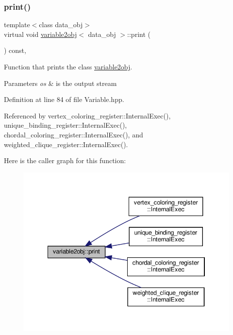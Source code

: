 \mbox{\label{structvariable2obj_a3de17dd615a1c64089337a0461ff0075}} 
\subsubsection{\texorpdfstring{print()}{print()}}
{\footnotesize\ttfamily template$<$class data\+\_\+obj$>$ \\
virtual void \hyperlink{structvariable2obj}{variable2obj}$<$ data\+\_\+obj $>$\+::print (\begin{DoxyParamCaption}{ }\end{DoxyParamCaption}) const\hspace{0.3cm}{\ttfamily [inline]}, {\ttfamily [virtual]}}



Function that prints the class \hyperlink{structvariable2obj}{variable2obj}. 


\begin{DoxyParams}{Parameters}
{\em os} & is the output stream \\
\hline
\end{DoxyParams}


Definition at line 84 of file Variable.\+hpp.



Referenced by vertex\+\_\+coloring\+\_\+register\+::\+Internal\+Exec(), unique\+\_\+binding\+\_\+register\+::\+Internal\+Exec(), chordal\+\_\+coloring\+\_\+register\+::\+Internal\+Exec(), and weighted\+\_\+clique\+\_\+register\+::\+Internal\+Exec().

Here is the caller graph for this function\+:
\nopagebreak
\begin{figure}[H]
\begin{center}
\leavevmode
\includegraphics[width=334pt]{d9/d92/structvariable2obj_a3de17dd615a1c64089337a0461ff0075_icgraph}
\end{center}
\end{figure}
\mbox{\label{structvariable2obj_a951c49f2d2a83790b32830b9f7fd1d30}} 

